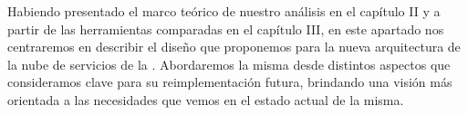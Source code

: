 Habiendo presentado el marco teórico de nuestro análisis en el capítulo II y a partir de las herramientas comparadas en el capítulo III, en este apartado nos centraremos en describir el diseño que proponemos para la nueva arquitectura de la nube de servicios de la \unlp. Abordaremos la misma desde distintos aspectos que consideramos clave para su reimplementación futura, brindando una visión más orientada a las necesidades que vemos en el estado actual de la misma.
